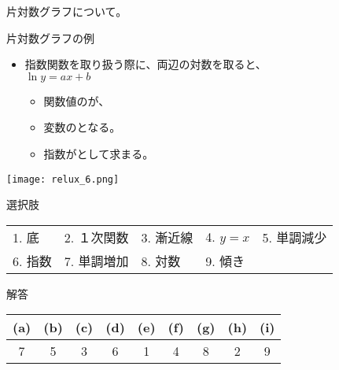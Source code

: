 \documentclass[uplatex,dvipdfmx,a4paper,11pt]{jsarticle}
\begin{document}
\begin{qlist}
\begin{qlist2}
			\qitem 片対数グラフについて。
			\begin{center}
				\begin{minipage}{0.48\textwidth}
					\begin{itembox}[l]{片対数グラフの例}
						\begin{itemize}
							\item 指数関数を取り扱う際に、両辺の対数を取ると、\\
							$\ln y = ax + b$
							\begin{itemize}
								\item 関数値の\qbox{}が、
								\item 変数の\qbox{}となる。
								\item 指数が\qbox{}として求まる。
							\end{itemize}
						\end{itemize}
					\end{itembox}
				\end{minipage}
				\begin{minipage}{0.4\textwidth}
					\begin{center}
					\texttt{[image: relux\_6.png]}
					\end{center}
				\end{minipage}
			\end{center}
		\end{qlist2}

		\begin{itembox}[l]{選択肢}
			\begin{center}
				\begin{tabular}{lllll}
					1. 底	&2. １次関数	&3. 漸近線	&4. $y=x$	&5. 単調減少\\
					6. 指数	&7. 単調増加		&8. 対数				&9. 傾き
				\end{tabular}
			\end{center}
		\end{itembox}
\end{qlist}

\begin{itembox}[l]{解答}
    \begin{center} 
      \begin{tabular}{|c|c|c|c|c|c|c|c|c|} \hline
        (a) & (b) & (c) & (d) & (e) & (f) & (g) & (h) & (i)\\ \hline
        7 & 5 & 3 & 6 & 1 & 4 & 8 & 2 & 9 \\ \hline		
      \end{tabular}
    \end{center}
\end{itembox}
\end{document}
